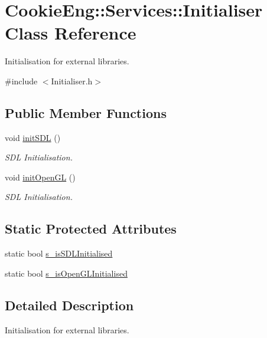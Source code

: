 \hypertarget{class_cookie_eng_1_1_services_1_1_initialiser}{}\section{Cookie\+Eng\+:\+:Services\+:\+:Initialiser Class Reference}
\label{class_cookie_eng_1_1_services_1_1_initialiser}


Initialisation for external libraries.  




{\ttfamily \#include $<$Initialiser.\+h$>$}

\subsection*{Public Member Functions}
\begin{DoxyCompactItemize}
\item 
void \hyperlink{class_cookie_eng_1_1_services_1_1_initialiser_afec78a371e6345982eda8b928065e5fa}{init\+S\+DL} ()
\begin{DoxyCompactList}\small\item\em S\+DL Initialisation. \end{DoxyCompactList}\item 
void \hyperlink{class_cookie_eng_1_1_services_1_1_initialiser_ae58fde55a85e7d2dfe3c1396aa64cad2}{init\+Open\+GL} ()
\begin{DoxyCompactList}\small\item\em S\+DL Initialisation. \end{DoxyCompactList}\end{DoxyCompactItemize}
\subsection*{Static Protected Attributes}
\begin{DoxyCompactItemize}
\item 
static bool \hyperlink{class_cookie_eng_1_1_services_1_1_initialiser_a5bbc123e5e61c2fd3d1f088c6d8ac147}{s\+\_\+is\+S\+D\+L\+Initialised}
\item 
static bool \hyperlink{class_cookie_eng_1_1_services_1_1_initialiser_ab699d2b64648af5ab728f76b23038d1d}{s\+\_\+is\+Open\+G\+L\+Initialised}
\end{DoxyCompactItemize}


\subsection{Detailed Description}
Initialisation for external libraries. 

